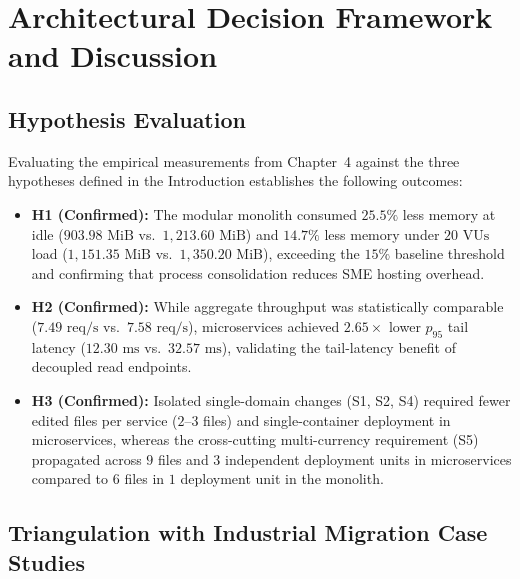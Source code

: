 \chapter{Architectural Decision Framework and Discussion}
\label{chap:discussion}

\section{Hypothesis Evaluation}
\label{sec:hypotheses-eval}

Evaluating the empirical measurements from Chapter~4 against the three hypotheses defined in the Introduction establishes the following outcomes:
\begin{itemize}[leftmargin=1.5em]
  \item \textbf{H1 (Confirmed):} The modular monolith consumed $25.5\%$ less memory at idle ($903.98\text{ MiB}$ vs.\ $1,213.60\text{ MiB}$) and $14.7\%$ less memory under $20\text{ VUs}$ load ($1,151.35\text{ MiB}$ vs.\ $1,350.20\text{ MiB}$), exceeding the $15\%$ baseline threshold and confirming that process consolidation reduces SME hosting overhead.
  \item \textbf{H2 (Confirmed):} While aggregate throughput was statistically comparable ($7.49\text{ req/s}$ vs.\ $7.58\text{ req/s}$), microservices achieved $2.65\times$ lower $p_{95}$ tail latency ($12.30\text{ ms}$ vs.\ $32.57\text{ ms}$), validating the tail-latency benefit of decoupled read endpoints.
  \item \textbf{H3 (Confirmed):} Isolated single-domain changes (S1, S2, S4) required fewer edited files per service ($2$--$3$ files) and single-container deployment in microservices, whereas the cross-cutting multi-currency requirement (S5) propagated across $9$ files and $3$ independent deployment units in microservices compared to $6$ files in $1$ deployment unit in the monolith.
\end{itemize}

\section{Triangulation with Industrial Migration Case Studies}
\label{sec:industry-triangulation}


